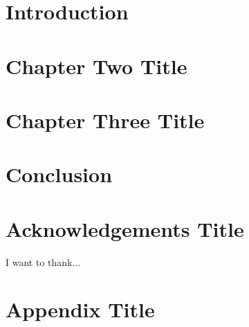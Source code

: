 \documentclass[12pt,twoside]{report}
\begin{document}

\thispagestyle{empty}




\tableofcontents
{}

\listoffigures
\thispagestyle{empty}

\listoftables
\thispagestyle{empty}

\clearpage
{}
\chapter{Introduction}


\chapter{Chapter Two Title}



\chapter{Chapter Three Title}


\chapter{Conclusion}


\nocite{*}

\clearpage
\printbibliography


\clearpage

\chapter*{Acknowledgements Title}
I want to thank...

\clearpage

\chapter*{Appendix Title}

\end{document}

